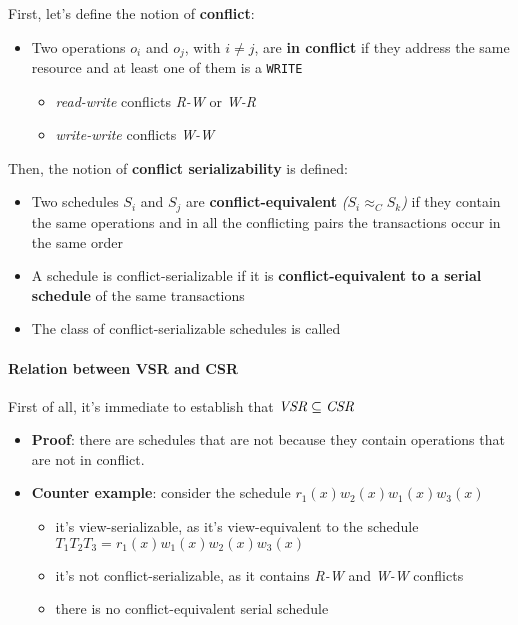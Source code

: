 \documentclass[english]{article}
\begin{document}
First, let's define the notion of \textbf{conflict}:

\begin{itemize}
  \item Two operations \(o_i\) and \(o_j\), with \(i \neq j\), are \textbf{in conflict} if they address the same resource and at least one of them is a \texttt{WRITE}
        \begin{itemize}
          \item \textit{read-write} conflicts \textit{R-W} or \textit{W-R}
          \item \textit{write-write} conflicts \textit{W-W}
        \end{itemize}
\end{itemize}

Then, the notion of \textbf{conflict serializability} is defined:

\begin{itemize}
  \item Two schedules \(S_i\) and \(S_j\) are \textbf{conflict-equivalent} \textit{(\(S_i \approx_C S_k\))} if they contain the same operations and in all the conflicting pairs the transactions occur in the same order
  \item A schedule is conflict-serializable if it is \textbf{conflict-equivalent to a serial schedule} of the same transactions
  \item The class of conflict-serializable schedules is called \CSR
\end{itemize}

\paragraph{Relation between VSR and CSR}

First of all, it's immediate to establish that \(\textit{VSR} \subseteq \textit{CSR}\)

\begin{itemize}
  \item \textbf{Proof}: there are \VSR schedules that are not \CSR because they contain operations that are not in conflict.
  \item \textbf{Counter example}: consider the schedule \(r_1(x) w_2(x) w_1(x) w_3(x)\)
        \begin{itemize}
          \item it's view-serializable, as it's view-equivalent to the schedule \(T_1 T_2 T_3 = r_1(x) w_1(x) w_2(x) w_3(x)\)
          \item it's not conflict-serializable, as it contains \textit{R-W} and \textit{W-W} conflicts
          \item there is no conflict-equivalent serial schedule
        \end{itemize}
\end{itemize}
\end{document}
